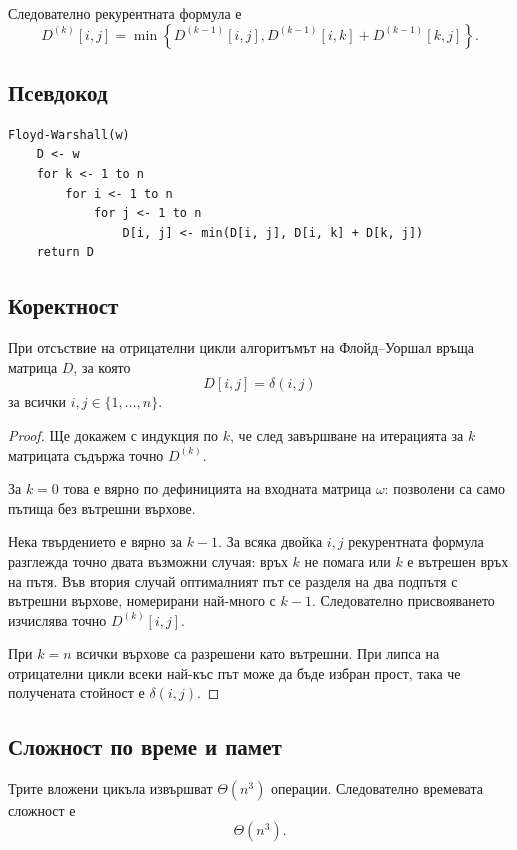 Следователно рекурентната формула е
\[
D^{(k)}[i,j]
=
\min\left\{
D^{(k-1)}[i,j],
D^{(k-1)}[i,k]+D^{(k-1)}[k,j]
\right\}.
\]

\subsection{Псевдокод}\label{s:8.6.3}

\begin{verbatim}
Floyd-Warshall(w)
    D <- w
    for k <- 1 to n
        for i <- 1 to n
            for j <- 1 to n
                D[i, j] <- min(D[i, j], D[i, k] + D[k, j])
    return D
\end{verbatim}

\subsection{Коректност}\label{s:8.6.4}

\begin{keythm}
При отсъствие на отрицателни цикли алгоритъмът на Флойд--Уоршал връща матрица $D$, за която
\[
D[i,j]=\delta(i,j)
\]
за всички $i,j\in\{1,\ldots,n\}$.
\end{keythm}

\begin{proof}
Ще докажем с индукция по $k$, че след завършване на итерацията за $k$ матрицата съдържа точно $D^{(k)}$.

За $k=0$ това е вярно по дефиницията на входната матрица $\omega$: позволени са само пътища без вътрешни върхове.

Нека твърдението е вярно за $k-1$. За всяка двойка $i,j$ рекурентната формула разглежда точно двата възможни случая: връх $k$ не помага или $k$ е вътрешен връх на пътя. Във втория случай оптималният път се разделя на два подпътя с вътрешни върхове, номерирани най-много с $k-1$. Следователно присвояването изчислява точно $D^{(k)}[i,j]$.

При $k=n$ всички върхове са разрешени като вътрешни. При липса на отрицателни цикли всеки най-къс път може да бъде избран прост, така че получената стойност е $\delta(i,j)$.
\end{proof}

\subsection{Сложност по време и памет}\label{s:8.6.5}

Трите вложени цикъла извършват $\Theta(n^3)$ операции. Следователно времевата сложност е
\[
\Theta(n^3).
\]

